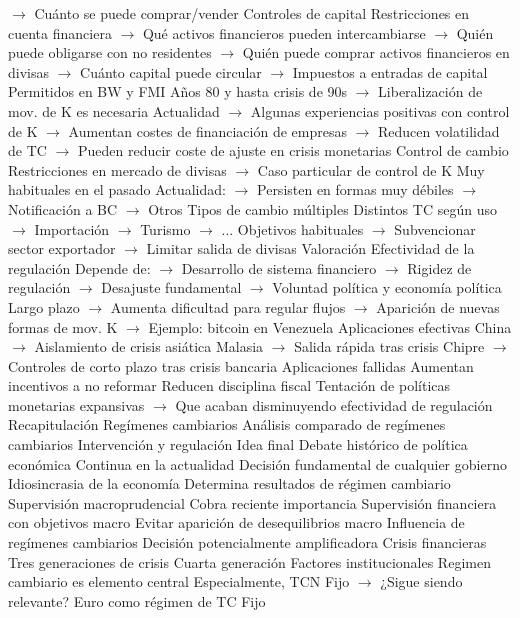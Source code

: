 \documentclass{nuevotema}
\begin{document}
\begin{esquemal}
				\4[] $\to$ Cuánto se puede comprar/vender
			\3 Controles de capital
				\4 Restricciones en cuenta financiera
				\4[] $\to$ Qué activos financieros pueden intercambiarse
				\4[] $\to$ Quién puede obligarse con no residentes
				\4[] $\to$ Quién puede comprar activos financieros en divisas
				\4[] $\to$ Cuánto capital puede circular
				\4[] $\to$ Impuestos a entradas de capital
				\4 Permitidos en BW y FMI
				\4 Años 80 y hasta crisis de 90s
				\4[] $\to$ Liberalización de mov. de K es necesaria
				\4 Actualidad
				\4[] $\to$ Algunas experiencias positivas con control de K
				\4[] $\to$ Aumentan costes de financiación de empresas
				\4[] $\to$ Reducen volatilidad de TC
				\4[] $\to$ Pueden reducir coste de ajuste en crisis monetarias
			\3 Control de cambio
				\4 Restricciones en mercado de divisas
				\4[] $\to$ Caso particular de control de K
				\4 Muy habituales en el pasado
				\4 Actualidad:
				\4[] $\to$ Persisten en formas muy débiles
				\4[] $\to$ Notificación a BC
				\4[] $\to$ Otros
			\3 Tipos de cambio múltiples
				\4 Distintos TC según uso
				\4[] $\to$ Importación
				\4[] $\to$ Turismo
				\4[] $\to$ ...
				\4 Objetivos habituales
				\4[] $\to$ Subvencionar sector exportador
				\4[] $\to$ Limitar salida de divisas
			\3 Valoración
				\4 Efectividad de la regulación
				\4[] Depende de:
				\4[] $\to$ Desarrollo de sistema financiero
				\4[] $\to$ Rigidez de regulación
				\4[] $\to$ Desajuste fundamental
				\4[] $\to$ Voluntad política y economía política
				\4[] Largo plazo
				\4[] $\to$ Aumenta dificultad para regular flujos
				\4[] $\to$ Aparición de nuevas formas de mov. K
				\4[] $\to$ Ejemplo: bitcoin en Venezuela
				\4 Aplicaciones efectivas
				\4[] China
				\4[] $\to$ Aislamiento de crisis asiática
				\4[] Malasia
				\4[] $\to$ Salida rápida tras crisis
				\4[] Chipre
				\4[] $\to$ Controles de corto plazo tras crisis bancaria
				\4 Aplicaciones fallidas
				\4[] Aumentan incentivos a no reformar
				\4[] Reducen disciplina fiscal
				\4[] Tentación de políticas monetarias expansivas
				\4[] $\to$ Que acaban disminuyendo efectividad de regulación
	\1[] 
		\2 Recapitulación
			\3 Regímenes cambiarios
			\3 Análisis comparado de regímenes cambiarios
			\3 Intervención y regulación
		\2 Idea final
			\3 Debate histórico de política económica
				\4 Continua en la actualidad
				\4 Decisión fundamental de cualquier gobierno
			\3 Idiosincrasia de la economía
				\4 Determina resultados de régimen cambiario
			\3 Supervisión macroprudencial
				\4 Cobra reciente importancia
				\4 Supervisión financiera con objetivos macro
				\4[] Evitar aparición de desequilibrios macro
				\4 Influencia de regímenes cambiarios
				\4[] Decisión potencialmente amplificadora
			\3 Crisis financieras
				\4 Tres generaciones de crisis
				\4 Cuarta generación
				\4[] Factores institucionales
				\4 Regimen cambiario es elemento central
				\4[] Especialmente, TCN Fijo
				\4[] $\to$ ¿Sigue siendo relevante?
			\3 Euro como régimen de TC Fijo
\end{esquemal}
\end{document}
